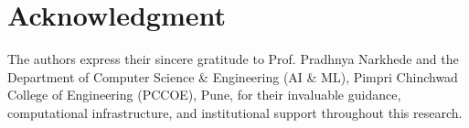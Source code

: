 \documentclass[conference]{IEEEtran}
\begin{document}
\section*{Acknowledgment}
The authors express their sincere gratitude to Prof. Pradhnya Narkhede and the Department of Computer Science \& Engineering (AI \& ML), Pimpri Chinchwad College of Engineering (PCCOE), Pune, for their invaluable guidance, computational infrastructure, and institutional support throughout this research.

\nocite{*}
\makeatletter
\def\thebibliography#1{\section*{\refname}%
    \fontsize{7.5pt}{8.8pt}\selectfont
    \list{\@biblabel{\@arabic\c@enumiv}}%
    {\settowidth\labelwidth{\@biblabel{#1}}%
    \leftmargin\labelwidth
    \advance\leftmargin\labelsep
    \itemsep -0.5pt\relax
    \parsep 0pt\relax
    \usecounter{enumiv}%
    \let\p@enumiv\@empty
    \renewcommand\theenumiv{\@arabic\c@enumiv}}%
    \let\newblock\@empty
    \sloppy\clubpenalty4000\widowpenalty4000%
    \sfcode`\.=1000\relax}
\makeatother


\end{document}
